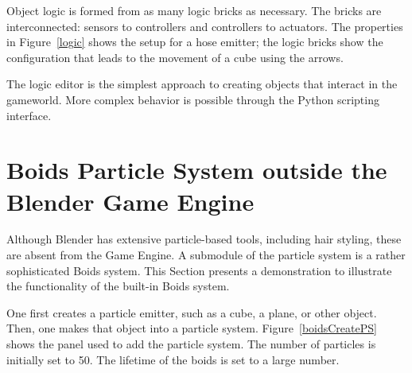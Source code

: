 Object logic is formed from as many logic bricks as necessary. The bricks are interconnected: sensors to controllers and controllers to actuators. The properties in Figure~\ref{logic} shows the setup for a hose emitter; the logic bricks show the configuration that leads to the movement of a cube using the arrows.

The logic editor is the simplest approach to creating objects that interact in the gameworld. More complex behavior is possible through the Python scripting interface.

\section{Boids Particle System outside the Blender Game Engine}
Although Blender has extensive particle-based tools, including hair styling, these are absent from the Game Engine. A submodule of the particle system is a rather sophisticated Boids system. This Section presents a demonstration to illustrate the functionality of the built-in Boids system. 

One first creates a particle emitter, such as a cube, a plane, or other object. Then, one makes that object into a particle system. Figure~\ref{boidsCreatePS} shows the panel used to add the particle system. The number of particles is initially set to 50. The lifetime of the boids is set to a large number.

